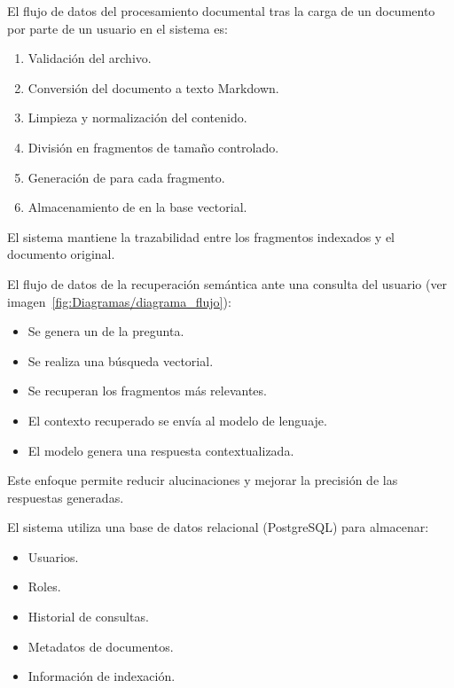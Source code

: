 
El flujo de datos del procesamiento documental tras la carga de un documento por parte de un usuario en el sistema es:

\begin{enumerate}
\tightlist
	\item Validación del archivo.	
	\item Conversión del documento a texto Markdown.
	\item Limpieza y normalización del contenido.
	\item División en fragmentos de tamaño controlado.
	\item Generación de  para cada fragmento.
	\item Almacenamiento de  en la base vectorial.
\end{enumerate}

El sistema mantiene la trazabilidad entre los fragmentos indexados y el documento original.

El flujo de datos de la recuperación semántica ante una consulta del usuario (ver imagen~\ref{fig:Diagramas/diagrama_flujo}):

\begin{itemize}
\tightlist
	\item Se genera un  de la pregunta.
	\item Se realiza una búsqueda vectorial.
	\item Se recuperan los fragmentos más relevantes.
	\item El contexto recuperado se envía al modelo de lenguaje.
	\item El modelo genera una respuesta contextualizada.
\end{itemize}

Este enfoque permite reducir alucinaciones y mejorar la precisión de las respuestas generadas.


El sistema utiliza una base de datos relacional (PostgreSQL) para almacenar:

\begin{itemize}
\tightlist
	\item Usuarios.
	\item Roles.
	\item Historial de consultas.
	\item Metadatos de documentos.
	\item Información de indexación.
\end{itemize}

